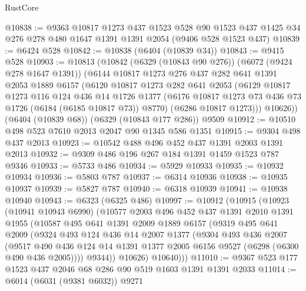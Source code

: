 \begin{lexlean}{RustCore}
\begin{coremodule}
@10838 := @9363
    @10817
    @1273
    @437
    @1523
    @528
    @90
    @1523
    @437
    @1425
    @34
    @276
    @278
    @480
    @1647
    @1391
    @1391
    @2054
    (@9406 @528 @1523 @437)
@10839 := @6424 @528
@10842 := @10838 (@6404 (@10839 @34))
@10843 := @9415 @528
@10903 := @10813
    (@10842
      (@6329 (@10843 @90 @276))
      (@6072 (@9424 @278 @1647 @1391))
      (@6144
        @10817
        @1273
        @276
        @437
        @282
        @641
        @1391
        @2053
        @1889
        @6157
        (@6120
          @10817
          @1273
          @282
          @641
          @2053
          (@6129
            @10817
            @1273
            @116
            @124
            @436
            @14
            @1726
            @1377
            (@6176 @10817 @1273 @73 @436 @73 @1726 (@6184 (@6185 @10817 @73)) @8770)
            (@6286 @10817 @1273)))
        @10626))
    (@6404 (@10839 @68))
    (@6329 (@10843 @177 @286))
    @9509
@10912 := @10510 @498 @523 @7610 @2013 @2047 @90 @1345 @586 @1351
@10915 := @9304 @498 @437 @2013
@10923 := @10542 @488 @496 @452 @437 @1391 @2003 @1391 @2013
@10932 := @9309 @486 @196 @267 @184 @1391 @1459 @1523 @787 @9346
@10933 := @5733 @486
@10934 := @5929 @10933
@10935 := @10932 @10934
@10936 := @5803 @787
@10937 := @6314 @10936
@10938 := @10935 @10937
@10939 := @5827 @787
@10940 := @6318 @10939
@10941 := @10938 @10940
@10943 := @6323 (@6325 @486)
@10997 := @10912
    (@10915
      (@10923
        (@10941 @10943 @6990)
        (@10577
          @2003
          @496
          @452
          @437
          @1391
          @2010
          @1391
          @1955
          (@10587
            @495
            @641
            @1391
            @2009
            @1889
            @6157
            (@9319
              @495
              @641
              @2009
              (@9324
                @493
                @124
                @436
                @14
                @2007
                @1377
                (@9304
                  @493
                  @436
                  @2007
                  (@9517
                    @490
                    @436
                    @124
                    @14
                    @1391
                    @1377
                    @2005
                    @6156
                    @9527
                    (@6298 (@6300 @490 @436 @2005))))
                @9344))
            @10626)
          @10640)))
@11010 := @9367 @523 @177 @1523 @437 @2046 @68 @286 @90 @519 @1603 @1391 @1391 @2033
@11014 := @6014 (@6031 (@9381 @6032)) @9271

\end{coremodule}
\end{lexlean}
